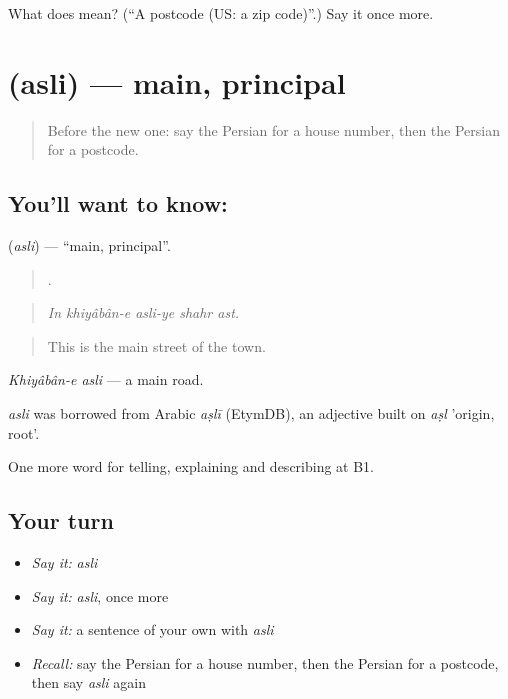 \begin{tcolorbox}[breakable,colback=teal!4,colframe=teal!35!black,title={Before you move on}]
What does  mean? (\textquotedblleft{}A postcode (US: a zip code)\textquotedblright{}.) Say it once more.
\end{tcolorbox}
\section[\texorpdfstring{\fa{اصلی} (asli)}{اصلی (asli)}]{ (asli) — main, principal}

\label{lesson:FA-C447-asli}



\begin{quote}
Before the new one: say the Persian for a house number, then the Persian for a postcode.
\end{quote}

\subsection*{You'll want to know: }
\textbf{} (\emph{asli}) — \textquotedblleft{}main, principal\textquotedblright{}.

\begin{quote}
    .
\end{quote}

\begin{quote}
\emph{In khiyâbân-e asli-ye shahr ast.}
\end{quote}

\begin{quote}
This is the main street of the town.
\end{quote}

\emph{Khiyâbân-e asli} — a main road.

\begin{cousinweb}
\emph{asli} was borrowed from Arabic \emph{aṣlī} (EtymDB), an adjective built on \emph{aṣl} 'origin, root'.
\end{cousinweb}

\begin{grammarlens}[title={What you've built}]
One more word for telling, explaining and describing at B1.
\end{grammarlens}

\subsection*{Your turn}
\begin{itemize}
\raggedright
  \item \emph{Say it:} \emph{asli}
  \item \emph{Say it:} \emph{asli}, once more
  \item \emph{Say it:} a sentence of your own with \emph{asli}
  \item \emph{Recall:} say the Persian for a house number, then the Persian for a postcode, then say \emph{asli} again
\end{itemize}

